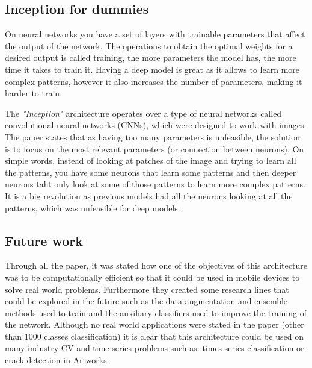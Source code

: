 \documentclass[12pt]{article}
\begin{document}
\vspace{0.5cm}

\subsection*{Inception for dummies}

On neural networks you have a set of layers with trainable parameters that affect the output of the network. The operations to obtain the optimal weights for
a desired output is called training, the more parameters the model has, the more time it takes to train it. Having a deep model is great as it allows to 
learn more complex patterns, however it also increases the number of parameters, making it harder to train. 

\vspace{0.5cm}

The \textit{"Inception"} architecture operates over a type of neural networks called convolutional neural networks (CNNs), which were designed to work with images.
The paper states that as having too many parameters is unfeasible, the solution is to focus on the most relevant parameters (or connection between neurons).
On simple words, instead of looking at patches of the image and trying to learn all the patterns, you have some neurons that learn some patterns and then 
deeper neurons taht only look at some of those patterns to learn more complex patterns. It is a big revolution as previous models had all the neurons looking 
at all the patterns, which was unfeasible for deep models. 

\vspace{0.5cm}

\subsection*{Future work}

Through all the paper, it was stated how one of the objectives of this architecture was to be computationally efficient so that it could be 
used in mobile devices to solve real world problems. Furthermore they created some research lines that could be explored in the future such 
as the data augmentation and ensemble methods used to train and the auxiliary classifiers used to improve the training of the network. Although 
no real world applications were stated in the paper (other than 1000 classes classification) it is clear that 
this architecture could be used on many industry CV and time series problems such as: times series classification or crack detection in Artworks.
\end{document}
